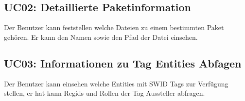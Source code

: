 \subsection{UC02: Detaillierte Paketinformation}
Der Benutzer kann feststellen welche Dateien zu einem bestimmten Paket gehören. Er kann den Namen sowie den Pfad der Datei einsehen.

\subsection*{UC03: Informationen zu Tag Entities Abfagen}
Der Benutzer kann einsehen welche Entities mit SWID Tags zur Verfügung stellen, er hat kann Regids und Rollen der Tag Aussteller abfragen.

